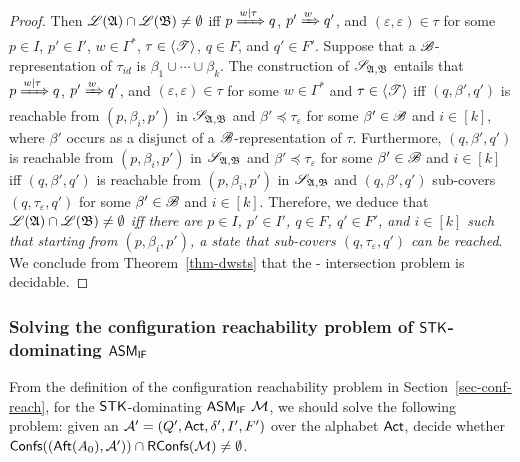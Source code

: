 \begin{proof}
Then ${\mathscr{L} }({\mathfrak{A} }) \cap {\mathscr{L} }({\mathfrak{B} }) \neq \emptyset$ iff $p \xRightarrow{w | \tau} q$, $p' \xRightarrow{w} q'$, and $(\varepsilon, \varepsilon) \in \tau$ for some $p \in I$, $p'\in I'$, $w \in \Gamma^*$, $\tau \in \langle {\mathscr{T} } \rangle$, $q \in F$, and $q' \in F'$. Suppose that a ${\mathscr{B} }$-representation of $\tau_{id}$ is $\beta_1 \cup \cdots \cup \beta_k$. 
The construction of $\mathscr{S}_{{\mathfrak{A} },{\mathfrak{B} }}$ entails that $p \xRightarrow{w | \tau} q$, $p' \xRightarrow{w} q'$, and $(\varepsilon, \varepsilon) \in \tau$ for some $w \in \Gamma^*$  and $\tau \in \langle {\mathscr{T} } \rangle$  iff $(q, \beta', q')$ is reachable from $(p, \beta_i, p')$ in $\mathscr{S}_{{\mathfrak{A} },{\mathfrak{B} }}$ and $\beta' \preceq \tau_\varepsilon$ for some $\beta' \in {\mathscr{B} }$ and $i \in [k]$, where $\beta'$ occurs as a disjunct of a ${\mathscr{B} }$-representation of $\tau$. 
%
Furthermore, $(q, \beta', q')$ is reachable from $(p, \beta_i, p')$ in $\mathscr{S}_{{\mathfrak{A} },{\mathfrak{B} }}$ and $\beta' \preceq \tau_\varepsilon$ for some $\beta' \in {\mathscr{B} }$ and $i \in [k]$ iff $(q, \beta', q')$ is reachable from $(p, \beta_i, p')$ in $\mathscr{S}_{{\mathfrak{A} },{\mathfrak{B} }}$ and $(q, \beta', q')$ sub-covers $(q, \tau_\varepsilon, q')$ for some $\beta' \in {\mathscr{B} }$ and $i \in [k]$. Therefore, we deduce that \emph{${\mathscr{L} }({\mathfrak{A} }) \cap {\mathscr{L} }({\mathfrak{B} }) \neq \emptyset$ iff there are $p \in I$, $p' \in I'$, $q \in F$, $q' \in F'$, and $i \in [k]$ such that starting from $(p, \beta_i, p')$, a state that sub-covers $(q, \tau_\varepsilon, q')$ can be reached}.
We conclude from Theorem~\ref{thm-dwsts} that the {\WOTrNFA}-{\NFA} intersection problem is decidable.
\end{proof}


\subsubsection{Solving the configuration reachability problem of ${\sf STK}$-dominating $\textsf{ASM}_\textsf{IF}$}\label{sec-ifamass-reach}

From the definition of the configuration reachability problem in Section~\ref{sec-conf-reach}, for the ${\sf STK}$-dominating $\textsf{ASM}_\textsf{IF}$ ${\mathcal{M} }$, we should solve the following problem: given an {\NFA} ${\mathcal{A} }' = (Q', {\sf Act}, \delta', I', F')$ over the alphabet ${\sf Act}$, decide whether ${\mathsf{Confs} }(({\sf Aft}(A_0), {\mathcal{A} }')) \cap \mathsf{RConfs}({\mathcal{M} }) \neq \emptyset$. 


